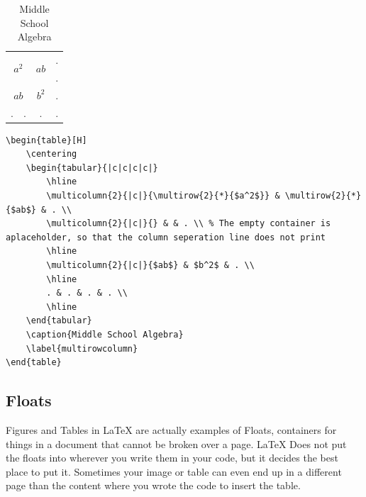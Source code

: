 \documentclass{article}
\theoremstyle{remark}
\begin{document}
    \begin{table}[H]
        \centering
        \begin{tabular}{|c|c|c|c|}
            \hline
            \multicolumn{2}{|c|}{\multirow{2}{*}{$a^2$}} & \multirow{2}{*}{$ab$} & . \\
            \multicolumn{2}{|c|}{} & & . \\ %
            \hline
            \multicolumn{2}{|c|}{$ab$} & $b^2$ & . \\
            \hline
            . & . & . & . \\
            \hline
        \end{tabular}
        \caption{Middle School Algebra}
        \label{multirowcolumn}
    \end{table}

\begin{lstlisting}
\begin{table}[H]
    \centering
    \begin{tabular}{|c|c|c|c|}
        \hline
        \multicolumn{2}{|c|}{\multirow{2}{*}{$a^2$}} & \multirow{2}{*}{$ab$} & . \\
        \multicolumn{2}{|c|}{} & & . \\ % The empty container is aplaceholder, so that the column seperation line does not print 
        \hline
        \multicolumn{2}{|c|}{$ab$} & $b^2$ & . \\
        \hline
        . & . & . & . \\
        \hline
    \end{tabular}
    \caption{Middle School Algebra}
    \label{multirowcolumn}
\end{table}
\end{lstlisting}

    \subsection{Floats}
    Figures and Tables in \LaTeX{} are actually examples of Floats, containers for things
    in a document that cannot be broken over a page. \LaTeX{} Does not put the floats into 
    wherever you write them in your code, but it decides the best place to put it. Sometimes
    your image or table can even end up in a different page than the content where you wrote
    the code to insert the table.
\end{document}
